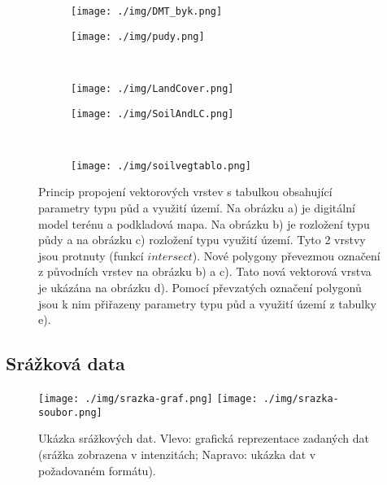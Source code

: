 \begin{figure}[t!]
  \centering

  \begin{subfigure}[b]{0.4\linewidth}
    \centering\texttt{[image: ./img/DMT\_byk.png]}
    \caption{\label{fig:dmt}}
  \end{subfigure}%
  \begin{subfigure}[b]{0.4\linewidth}
    \centering\texttt{[image: ./img/pudy.png]}
    \caption{\label{fig:puda}}
  \end{subfigure}\\
  \begin{subfigure}[b]{0.4\linewidth}
    \centering\texttt{[image: ./img/LandCover.png]}
    \caption{\label{fig:LU}}
  \end{subfigure}%
  \begin{subfigure}[b]{0.4\linewidth}
    \centering\texttt{[image: ./img/SoilAndLC.png]}
    \caption{\label{fig:prunik}}
  \end{subfigure}\\
  \begin{subfigure}[b]{0.8\linewidth}
    \centering\texttt{[image: ./img/soilvegtablo.png]}
    \caption{\label{fig:soilvegtablo}}
  \end{subfigure}%
  \caption{Princip propojení vektorových vrstev s tabulkou obsahující parametry typu půd a využití území. Na obrázku a) je digitální model terénu a podkladová mapa. Na obrázku b) je rozložení typu půdy a na obrázku c) rozložení typu využití území. Tyto 2 vrstvy jsou protnuty (funkcí $intersect$). Nové polygony převezmou označení z původních vrstev na obrázku b) a c). Tato nová vektorová vrstva je ukázána na obrázku d). Pomocí převzatých označení polygonů jsou k nim přiřazeny parametry typu půd a využití území z tabulky e).}
  \label{fig:soillu}
\end{figure}


















\FloatBarrier







\subsection{Srážková data} \label{sec:vstupsrazka}
\begin{figure}
  \centering
  \texttt{[image: ./img/srazka-graf.png]}
  \texttt{[image: ./img/srazka-soubor.png]}
  \caption{Ukázka srážkových dat. Vlevo: grafická reprezentace zadaných dat (srážka zobrazena v intenzitách; Napravo: ukázka dat v požadovaném formátu).}
  \label{fig:srazkovysoubor}
\end{figure}

